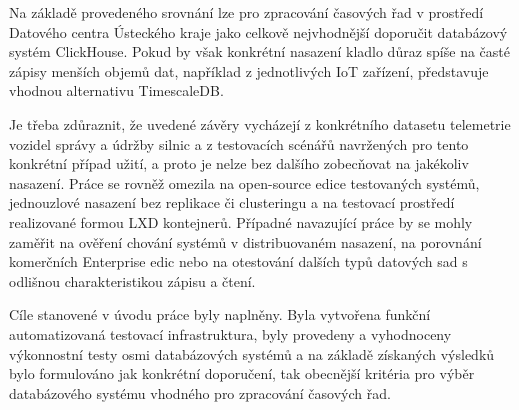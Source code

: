 Na základě provedeného srovnání lze pro zpracování časových řad v prostředí Datového centra Ústeckého kraje jako celkově nejvhodnější doporučit databázový systém ClickHouse. 
Pokud by však konkrétní nasazení kladlo důraz spíše na časté zápisy menších objemů dat, například z jednotlivých IoT zařízení, představuje vhodnou alternativu TimescaleDB.

Je třeba zdůraznit, že uvedené závěry vycházejí z konkrétního datasetu telemetrie vozidel správy a údržby silnic a z testovacích scénářů navržených pro tento konkrétní případ užití, a proto je nelze bez dalšího zobecňovat na jakékoliv nasazení. 
Práce se rovněž omezila na open-source edice testovaných systémů, jednouzlové nasazení bez replikace či clusteringu a na testovací prostředí realizované formou LXD kontejnerů. 
Případné navazující práce by se mohly zaměřit na ověření chování systémů v distribuovaném nasazení, na porovnání komerčních Enterprise edic nebo na otestování dalších typů datových sad s odlišnou charakteristikou zápisu a čtení.

Cíle stanovené v úvodu práce byly naplněny. Byla vytvořena funkční automatizovaná testovací infrastruktura, byly provedeny a vyhodnoceny výkonnostní testy osmi databázových systémů a na základě získaných výsledků bylo formulováno jak konkrétní doporučení, tak obecnější kritéria pro výběr databázového systému vhodného pro zpracování časových řad.